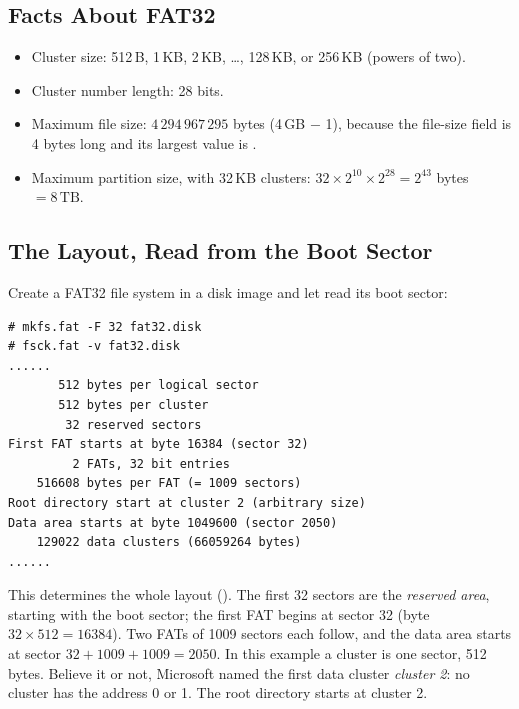 \newcommand{\fsinfo}[5]{%
  \foreach \h/\v [count=\i] in {\# of free clusters/#4, Next free cluster/#5} {
    \draw[fill=bootc] (#1,#2+25*\i-25) rectangle (#1+#3,#2+25*\i);
    \node[font=\tiny\bfseries, text=white] at (#1+#3/2,#2+25*\i-12.5) {\h};
    \draw[fill=rowc] (#1+#3,#2+25*\i-25) rectangle (#1+#3+50,#2+25*\i);
    \node[font=\tiny] (fs\i) at (#1+#3+25,#2+25*\i-12.5) {\v};
  }
  \draw[very thick] (#1,#2) rectangle (#1+#3+50,#2+50);
}
\newcommand{\fatblock}[2]{%
  \draw[-{Stealth[length=1.6mm]}] (675,0 |- #1) -- (727,0 |- #1);
  \draw[fill=datac] ($(731,0 |- #1)+(0,-8)$) rectangle ($(763,0 |- #1)+(0,8)$);
  \node[font=\scriptsize, anchor=west] at (772,0 |- #1) {Block #2};
}

\subsection{Facts About FAT32}

\begin{itemize}
  \item Cluster size: 512\,B, 1\,KB, 2\,KB, \dots, 128\,KB, or 256\,KB (powers of two).
  \item Cluster number length: 28 bits.
  \item Maximum file size: $4\,294\,967\,295$ bytes (4\,GB $-$ 1), because the file-size field is 4 bytes long and its largest value is .
  \item Maximum partition size, with 32\,KB clusters: $32 \times 2^{10} \times 2^{28} = 2^{43}$ bytes $= 8\,\text{TB}$.
\end{itemize}

\subsection{The Layout, Read from the Boot Sector}

Create a FAT32 file system in a disk image and let  read its boot sector:
\begin{lstlisting}[style=sh]
# mkfs.fat -F 32 fat32.disk
# fsck.fat -v fat32.disk
......
       512 bytes per logical sector
       512 bytes per cluster
        32 reserved sectors
First FAT starts at byte 16384 (sector 32)
         2 FATs, 32 bit entries
    516608 bytes per FAT (= 1009 sectors)
Root directory start at cluster 2 (arbitrary size)
Data area starts at byte 1049600 (sector 2050)
    129022 data clusters (66059264 bytes)
......
\end{lstlisting}
This determines the whole layout (). The first 32 sectors are the \emph{reserved area}, starting with the boot sector; the first FAT begins at sector 32 (byte $32 \times 512 = 16384$). Two FATs of 1009 sectors each follow, and the data area starts at sector $32 + 1009 + 1009 = 2050$. In this example a cluster is one sector, 512 bytes. Believe it or not, Microsoft named the first data cluster \emph{cluster 2}: no cluster has the address 0 or 1. The root directory starts at cluster 2.

